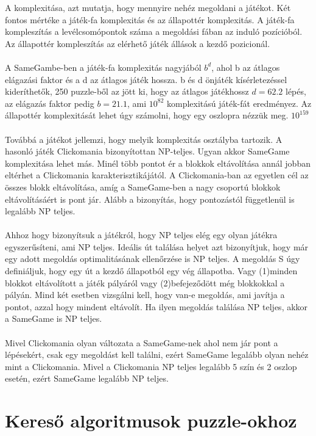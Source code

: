 \documentclass{article}
\begin{document}
	A komplexitása, azt mutatja, hogy mennyire nehéz megoldani a játékot. Két fontos mértéke a játék-fa komplexitás és az állapottér komplexitás.\cite{allis1994searching} A játék-fa kompleszítás a levélcsomópontok száma a megoldási fában az induló pozícióból. Az állapottér kompleszítás az elérhető játék állások a kezdő pozicionál.
	\\	
	\\
	A SameGambe-ben a játék-fa komplexitás nagyjából $b^d$, ahol b az átlagos elágazási faktor és a d az átlagos játék hossza. b és d önjáték kísérletezéssel kideríthetők, 250 puzzle-ből az jött ki, hogy az átlagos játékhossz $d=62.2$ lépés, az elágazás faktor pedig $b=21.1$, ami $10^{82}$ komplexitású játék-fát eredményez. Az állapottér komplexitását lehet úgy számolni, hogy egy oszlopra nézzük meg.  $10^{159}$\cite{SCHADD20123} 
	\\
	\\
	Továbbá a játékot jellemzi, hogy melyik komplexitás osztályba tartozik. \cite{johnson1990catalog} A hasonló játék Clickomania bizonyítottan NP-teljes. \cite{fleischer2002complexity} Ugyan akkor SameGame komplexitása lehet más. Minél több pontot ér a blokkok eltávolítása annál jobban eltérhet a Clickomania karakterisztikájától. A Clickomania-ban az egyetlen cél az összes blokk eltávolítása, amíg a SameGame-ben a nagy csoportú blokkok eltávolításáért is pont jár. Alább a bizonyítás, hogy pontozástól függetlenül is legalább NP teljes.
	\\
	\\
	Ahhoz hogy bizonyítsuk a játékról, hogy NP teljes elég egy olyan játékra egyszerűsíteni, ami NP teljes. Ideális út találása helyet azt bizonyítjuk, hogy már egy adott megoldás optimalitásának ellenőrzése is NP teljes. A megoldás S úgy definiáljuk, hogy egy út a kezdő állapotból egy vég állapotba. Vagy (1)minden blokkot eltávolított a játék pályáról vagy (2)befejeződött még blokkokkal a pályán. Mind két esetben vizsgálni kell, hogy van-e megoldás, ami javítja a pontot, azzal hogy mindent eltávolít. Ha ilyen megoldás találása NP teljes, akkor a SameGame is NP teljes.
	\\
	\\
	Mivel Clickomania olyan változata a SameGame-nek ahol nem jár pont a lépésekért, csak egy megoldást kell találni, ezért SameGame legalább olyan nehéz mint a Clickomania. Mivel a Clickomania NP teljes legalább 5 szín és 2 oszlop esetén\cite{fleischer2002complexity}, ezért SameGame legalább NP teljes.
	
	\section{Kereső algoritmusok puzzle-okhoz}	
	
\end{document}
